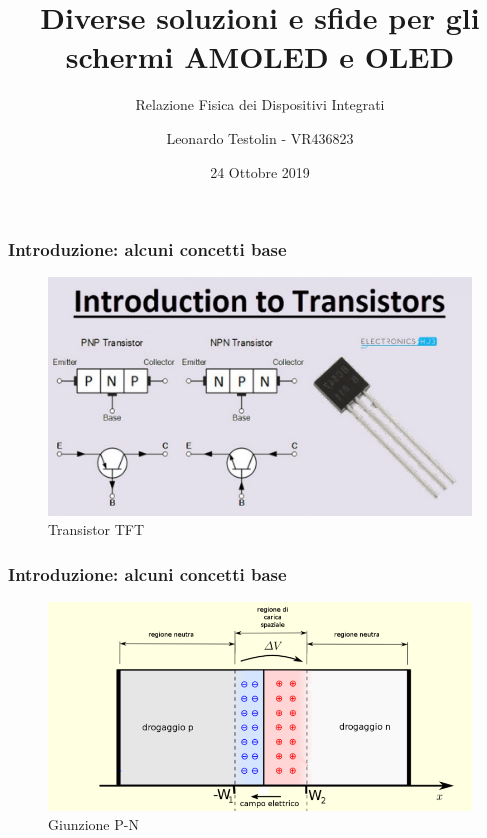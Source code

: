 \documentclass[12pt]{beamer}
\begin{document}
	\author{Leonardo Testolin - VR436823}
	\title{Diverse soluzioni e sfide per gli schermi AMOLED e OLED}
	\subtitle{Relazione Fisica dei Dispositivi Integrati}
	\date{24 Ottobre 2019}
	\begin{frame}[plain]
		\maketitle
	\end{frame}
	
	\begin{frame}
		\frametitle{Introduzione: alcuni concetti base}
		\begin{figure}
			\centering
			\includegraphics[width=1\linewidth]{IMMAGINI/TFT_tras}
			\caption{Transistor TFT}
			\label{fig:tfttras}
		\end{figure}
	\end{frame}
	\begin{frame}
		\frametitle{Introduzione: alcuni concetti base}
		\begin{figure}
			\centering
			\includegraphics[width=1\linewidth]{IMMAGINI/Giunzione_p-n}
			\caption{Giunzione P-N}
			\label{fig:giunzionep-n}
		\end{figure}
	\end{frame}
\end{document}
